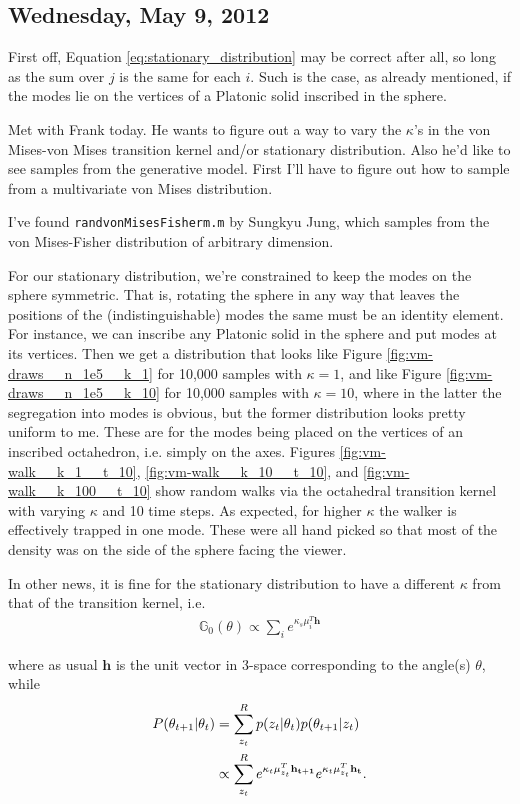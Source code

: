\documentclass[11pt]{article}
\begin{document}
\subsection*{Wednesday, May 9, 2012}

First off, Equation \eqref{eq:stationary_distribution} may be correct after all, so long as the sum over $j$ is the same for each $i$. Such is the case, as already mentioned, if the modes lie on the vertices of a Platonic solid inscribed in the sphere.

Met with Frank today. He wants to figure out a way to vary the $\kappa$'s in the von Mises-von Mises transition kernel and/or stationary distribution. Also he'd like to see samples from the generative model. First I'll have to figure out how to sample from a multivariate von Mises distribution.

I've found \texttt{randvonMisesFisherm.m} by Sungkyu Jung, which samples from the von Mises-Fisher distribution of arbitrary dimension.

For our stationary distribution, we're constrained to keep the modes on the sphere symmetric. That is, rotating the sphere in any way that leaves the positions of the (indistinguishable) modes the same must be an identity element. For instance, we can inscribe any Platonic solid in the sphere and put modes at its vertices. Then we get a distribution that looks like Figure \ref{fig:vm-draws__n_1e5__k_1} for 10,000 samples with $\kappa=1$, and like Figure \ref{fig:vm-draws__n_1e5__k_10} for 10,000 samples with $\kappa=10$, where in the latter the segregation into modes is obvious, but the former distribution looks pretty uniform to me. These are for the modes being placed on the vertices of an inscribed octahedron, i.e. simply on the axes. Figures \ref{fig:vm-walk__k_1__t_10}, \ref{fig:vm-walk__k_10__t_10}, and \ref{fig:vm-walk__k_100__t_10} show random walks via the octahedral transition kernel with varying $\kappa$ and 10 time steps. As expected, for higher $\kappa$ the walker is effectively trapped in one mode. These were all hand picked so that most of the density was on the side of the sphere facing the viewer.

In other news, it is fine for the stationary distribution to have a different $\kappa$ from that of the transition kernel, i.e.
%
\begin{align*}
\mathbb{G}_0(\theta) \propto \sum_i e^{\kappa_s \mu_i^T \mathbf{h}}
\end{align*}

\noindent where as usual $\mathbf{h}$ is the unit vector in 3-space corresponding to the angle(s) $\theta$, while
%
\begin{align}
\label{eq:transition_kernel}
P(\theta_{t+1} | \theta_{t}) &= \sum_{z_t}^R p(z_t|\theta_t) p(\theta_{t+1}|z_t) \notag \\
&\propto \sum_{z_t}^R e^{\kappa_t \mu_{z_t}^T \mathbf{h_{t+1}}} e^{\kappa_t \mu_{z_t}^T \mathbf{h_{t}}}.
\end{align}
\end{document}
